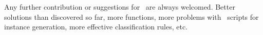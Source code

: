 Any further contribution or suggestions for \siplibtwo\ are always welcomed. Better solutions than discovered so far, more functions, more problems with \julia\ scripts for instance generation, more effective classification rules, etc.

